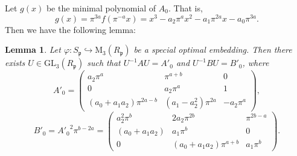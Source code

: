 \documentclass[12pt]{article}
\theoremstyle{plain}
\newtheorem{lemma}[theorem]{Lemma}
\theoremstyle{definition}
\theoremstyle{remark}
\begin{document}
Let $g(x)$ be the minimal polynomial of $A_0$. That is,
$$
g(x) = \pi^{3a}f(\pi^{-a}x)=x^3-a_2\pi^ax^2-a_1\pi^{2a}x-a_0\pi^{3a}.
$$
Then we have the following lemma:

\begin{lemma}\label{sinert}
Let $\varphi :S_\mathfrak{p}\hookrightarrow \mathrm{M}_3(R_\mathfrak{p})$ be a special optimal embedding. Then there exists $U\in \mathrm{GL}_3(R_\mathfrak{p})$ such that $U^{-1}AU = A'_0$ and $U^{-1}BU = B'_0$, where  
$$
A'_0=\begin{pmatrix}
a_2 \pi^{a} & \pi^{a+b} & 0 \\
0 & a_2 \pi^{a} & 1 \\
(a_0 + a_1 a_2)\pi^{2a-b} & (a_1 - a_2^2)\pi^{2a} & -a_2 \pi^{a}
\end{pmatrix},
$$
$$
B'_0={A'_0}^2\pi^{b-2a}=\begin{pmatrix}
a_2^{2}\pi^{b} & 2a_2\pi^{2b} & \pi^{2b-a} \\
(a_0+a_1a_2) & a_1\pi^{b} & 0 \\
0 & (a_0+a_1a_2)\pi^{a+b} & a_1\pi^{b}
\end{pmatrix}.
$$
\end{lemma}
\end{document}
